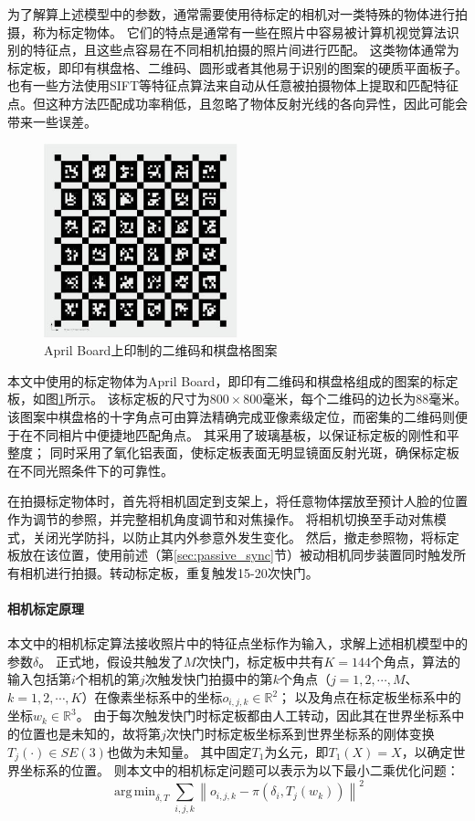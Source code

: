 \documentclass{ctexart}
\DeclareMathOperator*{\argmin}{arg\,min}
\begin{document}
为了解算上述模型中的参数，通常需要使用待标定的相机对一类特殊的物体进行拍摄，称为标定物体。
它们的特点是通常有一些在照片中容易被计算机视觉算法识别的特征点，且这些点容易在不同相机拍摄的照片间进行匹配。
这类物体通常为标定板，即印有棋盘格、二维码、圆形或者其他易于识别的图案的硬质平面板子。
也有一些方法\cite{colmap}使用SIFT等特征点算法来自动从任意被拍摄物体上提取和匹配特征点。但这种方法匹配成功率稍低，且忽略了物体反射光线的各向异性，因此可能会带来一些误差。

\begin{figure}
    \centering
    \includegraphics[width=0.5\textwidth]{figures/april_board}
    \caption{April Board上印制的二维码和棋盘格图案}
    \label{fig:april_board}
\end{figure}

本文中使用的标定物体为April Board，即印有二维码和棋盘格组成的图案的标定板，如图\ref{fig:april_board}所示。
该标定板的尺寸为$800 \times 800$毫米，每个二维码的边长为$88$毫米。
该图案中棋盘格的十字角点可由算法精确完成亚像素级定位，而密集的二维码则便于在不同相片中便捷地匹配角点。
其采用了玻璃基板，以保证标定板的刚性和平整度；
同时采用了氧化铝表面，使标定板表面无明显镜面反射光斑，确保标定板在不同光照条件下的可靠性。

在拍摄标定物体时，首先将相机固定到支架上，将任意物体摆放至预计人脸的位置作为调节的参照，并完整相机角度调节和对焦操作。
将相机切换至手动对焦模式，关闭光学防抖，以防止其内外参意外发生变化。
然后，撤走参照物，将标定板放在该位置，使用前述（第\ref{sec:passive_sync}节）被动相机同步装置同时触发所有相机进行拍摄。转动标定板，重复触发15-20次快门。

\paragraph{相机标定原理}本文中的相机标定算法接收照片中的特征点坐标作为输入，求解上述相机模型中的参数$\delta$。
正式地，假设共触发了$M$次快门，标定板中共有$K=144$个角点，算法的输入包括第$i$个相机的第$j$次触发快门拍摄中的第$k$个角点（$j = 1,2,\cdots,M$、$k = 1,2,\cdots,K$）在像素坐标系中的坐标$o_{i,j,k}\in \mathbb{R}^2$；
以及角点在标定板坐标系中的坐标$w_k\in \mathbb{R}^3$。
由于每次触发快门时标定板都由人工转动，因此其在世界坐标系中的位置也是未知的，故将第$j$次快门时标定板坐标系到世界坐标系的刚体变换$T_{j}(\cdot)\in SE(3)$也做为未知量。
其中固定$T_{1}$为幺元，即$T_{1}(X) = X$，以确定世界坐标系的位置。
则本文中的相机标定问题可以表示为以下最小二乘优化问题：
\begin{equation}
    \label{eq:calib_opt}
    \argmin_{\delta,T} \sum_{i,j,k} \left\| o_{i,j,k} - \pi\left(\delta_i, T_j(w_k)\right) \right\|^2
\end{equation}
\end{document}
